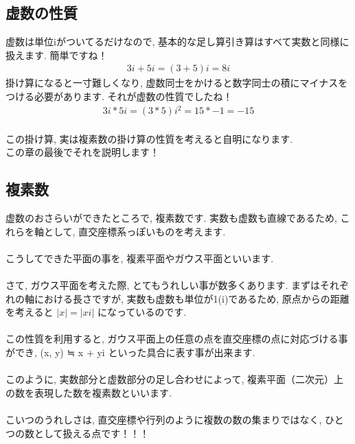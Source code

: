\documentclass[11pt,a4paper]{jreport}
\begin{document}
\subsection{虚数の性質}
虚数は単位iがついてるだけなので, 基本的な足し算引き算はすべて実数と同様に扱えます. 簡単ですね！\\
\begin{eqnarray}
3i + 5i  =(3 + 5)i = 8i
\end{eqnarray}
掛け算になると一寸難しくなり, 虚数同士をかけると数字同士の積にマイナスをつける必要があります. それが虚数の性質でしたね！\\
\begin{eqnarray}
3i * 5i = (3*5)i^2 = 15 * -1 = -15
\end{eqnarray}
\\
この掛け算, 実は複素数の掛け算の性質を考えると自明になります.\\
この章の最後でそれを説明します！\\
\subsection{複素数}
虚数のおさらいができたところで, 複素数です. 実数も虚数も直線であるため, これらを軸として, 直交座標系っぽいものを考えます.\\
\\
こうしてできた平面の事を, 複素平面やガウス平面といいます.\\
\\
さて, ガウス平面を考えた際, とてもうれしい事が数多くあります. まずはそれぞれの軸における長さですが, 実数も虚数も単位が1(i)であるため, 原点からの距離を考えると $ |x| = |xi| $ になっているのです. \\
\\
この性質を利用すると, ガウス平面上の任意の点を直交座標の点に対応づける事ができ, (x, y) ≒ x + yi といった具合に表す事が出来ます. \\
\\
このように, 実数部分と虚数部分の足し合わせによって, 複素平面（二次元）上の数を表現した数を複素数といいます.\\
\\
こいつのうれしさは, 直交座標や行列のように複数の数の集まりではなく, ひとつの数として扱える点です！！！\\
\end{document}
